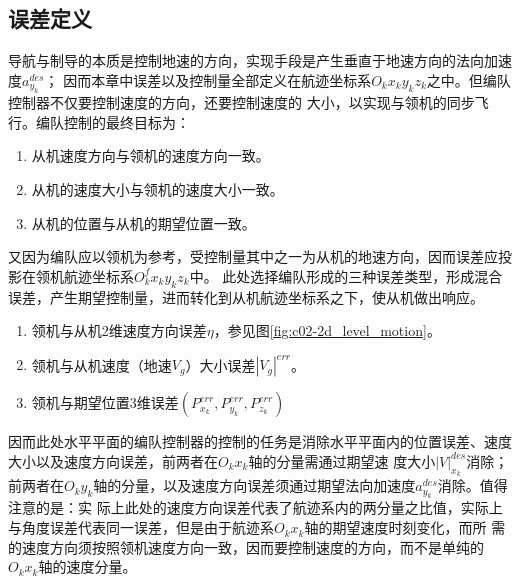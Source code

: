 \subsection{误差定义}
导航与制导的本质是控制地速的方向，实现手段是产生垂直于地速方向的法向加速度$a_{y_k}^{des}$；
因而本章中误差以及控制量全部定义在航迹坐标系$O_kx_ky_kz_k$之中。但编队控制器不仅要控制速度的方向，还要控制速度的
大小，以实现与领机的同步飞行。编队控制的最终目标为：
\begin{enumerate}
    \item 从机速度方向与领机的速度方向一致。
    \item 从机的速度大小与领机的速度大小一致。
    \item 从机的位置与从机的期望位置一致。
\end{enumerate}
又因为编队应以领机为参考，受控制量其中之一为从机的地速方向，因而误差应投影在领机航迹坐标系$O^{f}_kx_ky_kz_k$中。
此处选择编队形成的三种误差类型，形成混合误差，产生期望控制量，进而转化到从机航迹坐标系之下，使从机做出响应。
\begin{enumerate}
    \item 领机与从机2维速度方向误差$\eta$，参见图\ref{fig:c02-2d_level_motion}。%
    \item 领机与从机速度（地速$V_g$）大小误差$|V_g|^{err}$。
    \item 领机与期望位置3维误差$(P_{x_k}^{err},P_{y_k}^{err},P_{z_k}^{err})$
\end{enumerate}
因而此处水平平面的编队控制器的控制的任务是消除水平平面内的位置误差、速度大小以及速度方向误差，前两者在$O_kx_k$轴的分量需通过期望速
度大小${|V|}_{x_k}^{des}$消除；前两者在$O_ky_k$轴的分量，以及速度方向误差须通过期望法向加速度$a_{y_k}^{des}$消除。值得注意的是：实
际上此处的速度方向误差代表了航迹系内的两分量之比值，实际上与角度误差代表同一误差，但是由于航迹系$O_kx_k$轴的期望速度时刻变化，而所
需的速度方向须按照领机速度方向一致，因而要控制速度的方向，而不是单纯的$O_kx_k$轴的速度分量。
